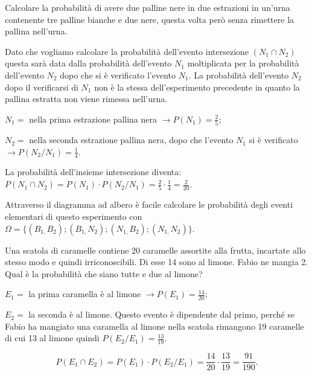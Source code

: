 \begin{exrig}
\begin{esempio}
Calcolare la probabilità di avere due palline nere in due estrazioni in un'urna contenente tre palline bianche e due nere, questa volta però senza rimettere la pallina nell'urna.

Dato che vogliamo calcolare la probabilità dell'evento intersezione $(N_1\cap N_2)$ questa sarà data dalla probabilità dell'evento $N_1$ moltiplicata per la probabilità dell'evento $N_2$ dopo che si è verificato l'evento $N_1$. La probabilità dell'evento $N_2$ dopo il verificarsi di $N_1$ non è la stessa dell'esperimento precedente in quanto la pallina estratta non viene rimessa nell'urna.
\begin{itemize*}
\item $ N_{1}= $ nella prima estrazione pallina nera $\to P(N_1)=\frac 2 5$;
\item$ N_{2}= $ nella seconda estrazione pallina nera, dopo che l'evento $N_1$ si è verificato $\to P(N_2/N_1)=\frac 1 4$.
\end{itemize*}
\newpage
\begin{center}
 
\end{center}
La probabilità dell'insieme intersezione diventa: $P(N_1\cap N_2)=P(N_1)\cdot P(N_2/N_1)=\frac 2 5\cdot \frac 1 4=\frac 2{20}$.

Attraverso il diagramma ad albero è facile calcolare le probabilità degli eventi elementari di questo esperimento con $\Omega =\{(B_{1,}B_2);(B_{1,}N_2);(N_{1,}B_2);(N_{1,}N_2)\}$.
\end{esempio}

\begin{esempio}
Una scatola di caramelle contiene 20 caramelle assortite alla frutta, incartate allo stesso modo e quindi irriconoscibili. Di esse 14 sono al limone. Fabio ne mangia 2. Qual è la probabilità che siano tutte e due al limone?
\begin{itemize*}
\item $E_1=$ la prima caramella è al limone $\to P(E_1)=\frac{14}{20}$;
\item $E_2=$ la seconda è al limone. Questo evento è dipendente dal primo, perché se Fabio ha mangiato una caramella al limone nella scatola rimangono 19 caramelle di cui 13 al limone quindi $P(E_2/E_1)=\frac{13}{19}$.
\end{itemize*}
\[P(E_1\cap E_2)=P(E_1)\cdot P(E_2/E_1)=\frac{14}{20}\cdot \frac{13}{19}=\frac{91}{190}.\]
\end{esempio}
\end{exrig}

